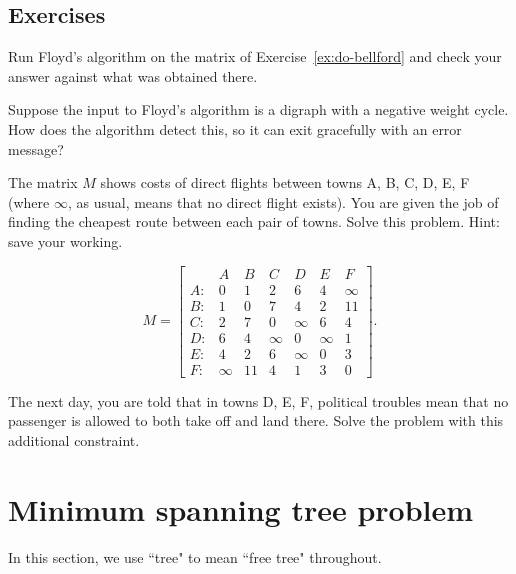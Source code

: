 \subsection*{Exercises}

\begin{Exercise}
\label{do-floyd}
Run Floyd's algorithm on the matrix of Exercise~\ref{ex:do-bellford} and check your answer against what was obtained there.

\end{Exercise}

\begin{Exercise}
\label{ex:floyd-neg-cycle}
Suppose the input to Floyd's algorithm is a digraph with a negative
weight cycle. How does the algorithm detect this, so it can exit
gracefully with an error message?

\end{Exercise}

\begin{Exercise}
\label{ex:do-floyd-trick}

\item The matrix $M$ shows costs of direct flights between towns A, B, C, D, E, F (where $\infty$, as usual, means that no direct flight exists). You are given the job of finding the cheapest route between each pair of towns. Solve this problem. Hint: save your working.

$$
M = \left[
\begin{matrix}
   & A & B & C & D & E & F\\
A: & 0 & 1 & 2 & 6 & 4 & \infty \\
B: & 1 & 0 & 7 & 4 & 2 & 11 \\
C: & 2 & 7 & 0 & \infty & 6 & 4\\
D: & 6 & 4 & \infty & 0 & \infty & 1 \\
E: & 4 & 2 & 6 & \infty & 0 & 3 \\
F: & \infty &11 & 4 & 1 & 3 & 0
\end{matrix}
\right].
$$

The next day, you are told that in towns D, E, F, political troubles mean that no passenger is  allowed to both take off and land there. Solve the problem with this additional constraint. 

\end{Exercise}

\section{Minimum spanning tree problem}
\label{sec:MST}
In this section, we use ``tree" to mean ``free tree" throughout.

